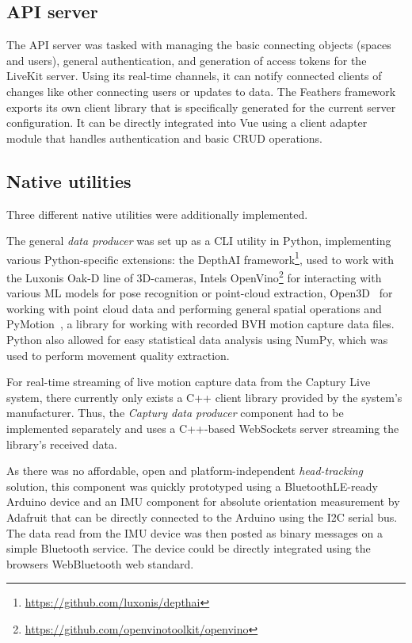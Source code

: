\subsection{API server}
\label{subsec:api-backend}

The \ac{API} server was tasked with managing the basic connecting objects (spaces and users), general authentication, and generation of access tokens for the LiveKit server.
Using its real-time channels, it can notify connected clients of changes like other connecting users or updates to data.
The Feathers framework exports its own client library that is specifically generated for the current server configuration.
It can be directly integrated into Vue using a client adapter module that handles authentication and basic \ac{CRUD} operations.

\subsection{Native utilities}
\label{subsec:native-utilities}

Three different native utilities were additionally implemented.

The general \emph{data producer} was set up as a \ac{CLI} utility in Python, implementing various Python-specific extensions: the DepthAI framework\footnote{\url{https://github.com/luxonis/depthai}}, used to work with the Luxonis Oak-D line of \ac{3D}-cameras, Intel\textquotesingle s OpenVino\footnote{\url{https://github.com/openvinotoolkit/openvino}} for interacting with various \ac{ML} models for pose recognition or point-cloud extraction, Open3D~\parencite{open3DZhou2018} for working with point cloud data and performing general spatial operations and PyMotion~\parencite{githubPyMotion}, a library for working with recorded \ac{BVH} motion capture data files.
Python also allowed for easy statistical data analysis using NumPy, which was used to perform movement quality extraction.

For real-time streaming of live motion capture data from the Captury Live system, there currently only exists a C++ client library provided by the system's manufacturer.
Thus, the \emph{Captury data producer} component had to be implemented separately and uses a C++-based WebSockets server streaming the library's received data.

As there was no affordable, open and platform-independent \emph{head-tracking} solution, this component was quickly prototyped using a BluetoothLE-ready Arduino device and an \ac{IMU} component for absolute orientation measurement by Adafruit that can be directly connected to the Arduino using the \ac{I2C} serial bus.
The data read from the \ac{IMU} device was then posted as binary messages on a simple Bluetooth service.
The device could be directly integrated using the browser\textquotesingle s WebBluetooth web standard.

